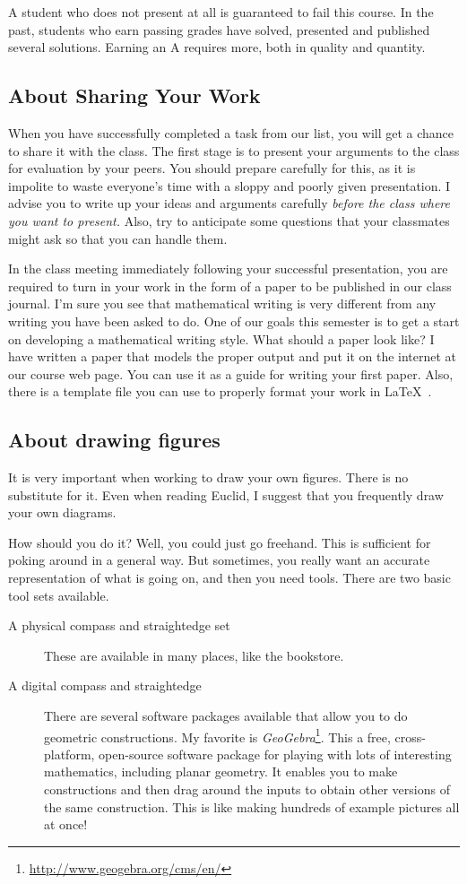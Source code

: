 \documentclass{tufte-handout}
\theoremstyle{definition}
\begin{document}
A student who does not present at all is guaranteed to fail this course.
In the past, students who earn passing grades have solved, presented and published several solutions.
Earning an A requires more, both in quality and quantity.

\subsection*{About Sharing Your Work}
When you have successfully completed a task from our list, you will get a chance to share it with the class.
The first stage is to present your arguments to the class for evaluation by your peers.
You should prepare carefully for this, as it is impolite to waste everyone's time with a sloppy and poorly given presentation.
I advise you to write up your ideas and arguments carefully \emph{before the class where you want to present.}
Also, try to anticipate some questions that your classmates might ask so that you can handle them.




In the class meeting immediately following your successful presentation, you are required to turn in your work in the form of a paper to be published in our class journal.
I'm sure you see that mathematical writing is very different from any writing you have been asked to do.
One of our goals this semester is to get a start on developing a mathematical writing style.
What should a paper look like?
I have written a paper that models the proper output and put it on the internet at our course web page.
You can use it as a guide for writing your first paper.
Also, there is a template file you can use to properly format your work in \LaTeX\ .


\subsection*{About drawing figures}
It is very important when working to draw your own figures.
There is no substitute for it.
Even when reading Euclid, I suggest that you frequently draw your own diagrams.

How should you do it?
Well, you could just go freehand.
This is sufficient for poking around in a general way.
But sometimes, you really want an accurate representation of what is going on, and then you need tools.
There are two basic tool sets available.
\begin{description}
\item[A physical compass and straightedge set] These are available in many places, like the bookstore.
\item[A digital compass and straightedge] There are several software packages available that allow you to do geometric constructions.
My favorite is \emph{GeoGebra}\footnote{\url{http://www.geogebra.org/cms/en/}}.
This a free, cross-platform, open-source software package for playing with lots of interesting mathematics, including planar geometry.
It enables you to make constructions and then drag around the inputs to obtain other versions of the same construction.
This is like making hundreds of example pictures all at once!
\end{description}
\end{document}
